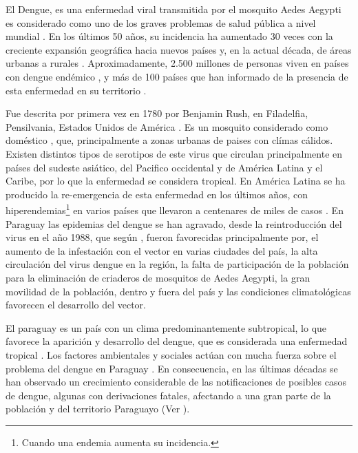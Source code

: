 
El Dengue, es una enfermedad viral transmitida por el mosquito Aedes Aegypti es considerado como
uno de los graves problemas de salud pública a nivel mundial
\citep{dengueUruguayCap1, world2009dengue, DIBO2005}. En los últimos 50 años, su incidencia ha aumentado 30
veces con la creciente expansión geográfica hacia nuevos países y, en la actual década, de
áreas urbanas a rurales \cite{world2009dengue}. Aproximadamente, 2.500 millones de personas viven
en países con dengue endémico \cite{world2009dengue, gustavo2006dengue}, y más de 100 países que
han informado de la presencia de esta enfermedad en su territorio \cite{gustavo2006dengue}.

Fue descrita por primera vez en 1780 por Benjamin Rush, en Filadelfia, Pensilvania, Estados Unidos
de América \citep{gustavo2006dengue}. Es un mosquito considerado como doméstico
\cite{luevano1993ciclo}, que, principalmente a zonas urbanas de paises con clímas cálidos. Existen
distintos tipos de serotipos de este virus que circulan principalmente en países del sudeste
asiático, del Pacifico occidental y de América Latina y el Caribe, por lo que la enfermedad se
considera tropical\citep{gustavo2006dengue}. En América Latina se ha producido la re-emergencia de
esta enfermedad en los últimos años, con hiperendemias\footnote{ Cuando una endemia aumenta su
incidencia.} en varios países que llevaron a centenares de miles de casos \citep{dengueUruguayCap1}
. En Paraguay las epidemias del dengue se han agravado, desde la reintroducción del virus en el
año 1988, que según \cite{planControlMspbs2014}, fueron favorecidas principalmente por, el aumento
de la infestación con el vector en varias ciudades del país, la alta circulación del virus dengue
en la región, la falta de participación de la población para la eliminación de criaderos de
mosquitos de Aedes Aegypti, la gran movilidad de la población, dentro y fuera del país y las
condiciones climatológicas favorecen el desarrollo del vector.

El paraguay es un país con un clima predominantemente subtropical, lo que favorece la aparición y
desarrollo del dengue, que es considerada una enfermedad tropical \cite{gustavo2006dengue,DIBO2005}. Los
factores ambientales y sociales actúan con mucha fuerza sobre el problema del dengue en Paraguay
\cite{website:mspbsHistoria2014}. En consecuencia, en las últimas décadas se han observado un
crecimiento considerable de las notificaciones de posibles casos de dengue, algunas con
derivaciones fatales, afectando a una gran parte de la población y del territorio Paraguayo
(Ver ).

